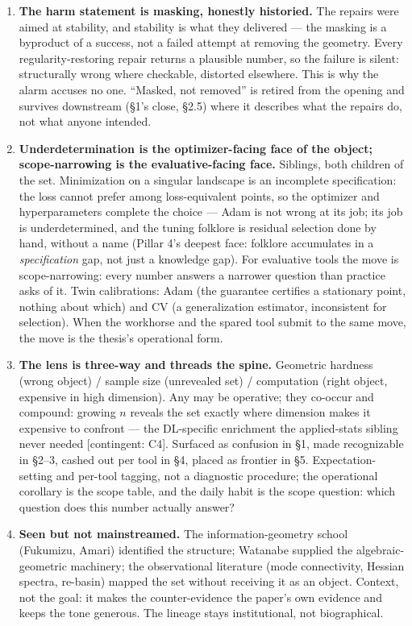 \documentclass[11pt]{article}
\begin{document}
\begin{enumerate}[label=(\alph*), itemsep=6pt]
\item \textbf{The harm statement is masking, honestly historied.} The
repairs were aimed at stability, and stability is what they delivered
--- the masking is a byproduct of a success, not a failed attempt at
removing the geometry. Every regularity-restoring repair returns a
plausible number, so the failure is silent: structurally wrong where
checkable, distorted elsewhere. This is why the alarm accuses no one.
``Masked, not removed'' is retired from the opening and survives
downstream (\S1's close, \S2.5) where it describes what the repairs do,
not what anyone intended.

\item \textbf{Underdetermination is the optimizer-facing face of the
object; scope-narrowing is the evaluative-facing face.} Siblings, both
children of the set. Minimization on a singular landscape is an
incomplete specification: the loss cannot prefer among loss-equivalent
points, so the optimizer and hyperparameters complete the choice ---
Adam is not wrong at its job; its job is underdetermined, and the tuning
folklore is residual selection done by hand, without a name (Pillar 4's
deepest face: folklore accumulates in a \emph{specification} gap, not
just a knowledge gap). For evaluative tools the move is scope-narrowing:
every number answers a narrower question than practice asks of it. Twin
calibrations: Adam (the guarantee certifies a stationary point, nothing
about which) and CV (a generalization estimator, inconsistent for
selection). When the workhorse and the spared tool submit to the same
move, the move is the thesis's operational form.

\item \textbf{The lens is three-way and threads the spine.} Geometric
hardness (wrong object) / sample size (unrevealed set) / computation
(right object, expensive in high dimension). Any may be operative; they
co-occur and compound: growing $n$ reveals the set exactly where
dimension makes it expensive to confront --- the DL-specific enrichment
the applied-stats sibling never needed [contingent: C4]. Surfaced as
confusion in \S1, made recognizable in \S2--3, cashed out per tool in
\S4, placed as frontier in \S5. Expectation-setting and per-tool
tagging, not a diagnostic procedure; the operational corollary is the
scope table, and the daily habit is the scope question: which question
does this number actually answer?

\item \textbf{Seen but not mainstreamed.} The information-geometry
school (Fukumizu, Amari) identified the structure; Watanabe supplied the
algebraic-geometric machinery; the observational literature (mode
connectivity, Hessian spectra, re-basin) mapped the set without
receiving it as an object. Context, not the goal: it makes the
counter-evidence the paper's own evidence and keeps the tone generous.
The lineage stays institutional, not biographical.


\end{enumerate}
\end{document}
